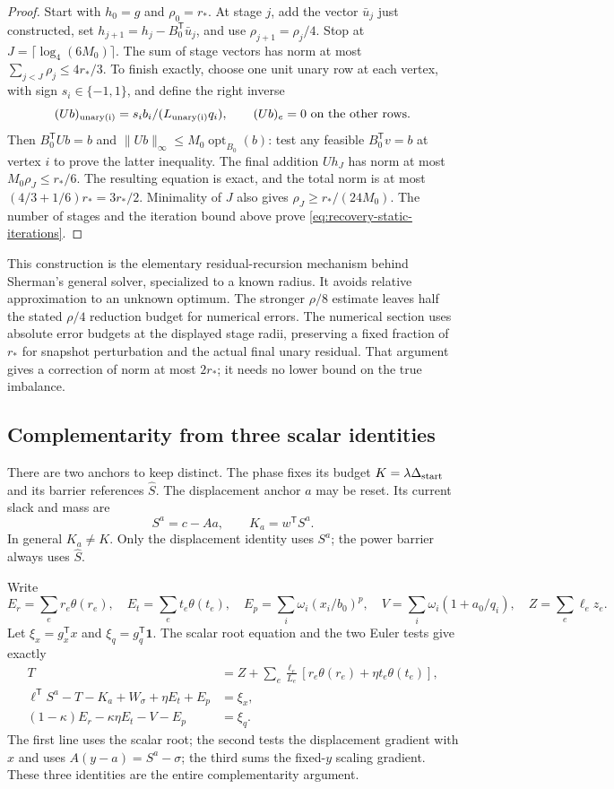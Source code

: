 \documentclass[11pt]{article}
\theoremstyle{definition}\newtheorem{definition}[theorem]{Definition}
\theoremstyle{remark}\newtheorem{remark}[theorem]{Remark}
\begin{document}
\begin{proof}
Start with $h_0=g$ and $\rho_0=r_*$. At stage $j$, add the vector
$\bar u_j$ just constructed, set
$h_{j+1}=h_j-B_0^{\mathsf T}\bar u_j$, and use
$\rho_{j+1}=\rho_j/4$. Stop at
$J=\lceil\log_4(6M_0)\rceil$. The sum of stage vectors has norm at
most $\sum_{j<J}\rho_j\le4r_*/3$.
To finish exactly, choose one unit unary row at each vertex, with sign
$s_i\in\{-1,1\}$, and define the right inverse
\[
 (Ub)_{\rm unary(i)}=s_i b_i/(L_{\rm unary(i)}q_i),\qquad
 (Ub)_e=0\text{ on the other rows}.
\]
Then $B_0^{\mathsf T}Ub=b$ and
$\|Ub\|_\infty\le M_0\operatorname{opt}_{B_0}(b)$: test any feasible
$B_0^{\mathsf T}v=b$ at vertex $i$ to prove the latter inequality.
The final addition $Uh_J$ has norm at most $M_0\rho_J\le r_*/6$.
The resulting equation is exact, and the total norm is at most
$(4/3+1/6)r_*=3r_*/2$. Minimality of $J$ also gives
$\rho_J\ge r_*/(24M_0)$. The number of stages and the iteration bound
above prove \eqref{eq:recovery-static-iterations}.
\end{proof}

This construction is the elementary residual-recursion mechanism behind
Sherman's general solver, specialized to a known radius. It avoids
relative approximation to an unknown optimum. The stronger $\rho/8$
estimate leaves half the stated $\rho/4$ reduction budget for numerical
errors. The numerical section
uses absolute error budgets at the displayed stage radii, preserving a
fixed fraction of $r_*$ for snapshot perturbation and the actual final
unary residual. That argument gives a correction of norm at most $2r_*$;
it needs no lower bound on the true imbalance.

\subsection{Complementarity from three scalar identities}

There are two anchors to keep distinct. The phase fixes its budget
$K=\lambda\Delta_{\rm start}$ and its barrier references $\widehat S$.
The displacement anchor $a$ may be reset. Its current slack and mass are
\[
 S^a=c-Aa,\qquad K_a=w^{\mathsf T}S^a.
\]
In general $K_a\ne K$. Only the displacement identity uses $S^a$;
the power barrier always uses $\widehat S$.

Write
\[
 E_r=\sum_er_e\theta(r_e),\quad E_t=\sum_et_e\theta(t_e),\quad
 E_p=\sum_i\omega_i(x_i/b_0)^p,\quad
 V=\sum_i\omega_i(1+a_0/q_i),\quad Z=\sum_e\ell_ez_e.
\]
Let $\xi_x=g_x^{\mathsf T}x$ and $\xi_q=g_q^{\mathsf T}\mathbf1$.
The scalar root equation and the two Euler tests give exactly
\begin{align}
 T&=Z+\sum_e\frac{\ell_e}{L_e}
               [r_e\theta(r_e)+\eta t_e\theta(t_e)],
 \label{eq:recovery-euler-root}\\
 \ell^{\mathsf T}S^a-T-K_a+W_\sigma+\eta E_t+E_p&=\xi_x,
 \label{eq:recovery-euler-x}\\
 (1-\kappa)E_r-\kappa\eta E_t-V-E_p&=\xi_q.
 \label{eq:recovery-euler-q}
\end{align}
The first line uses the scalar root; the second tests the displacement
gradient with $x$ and uses $A(y-a)=S^a-\sigma$; the third sums the
fixed-$y$ scaling gradient. These three identities are the entire
complementarity argument.
\end{document}
